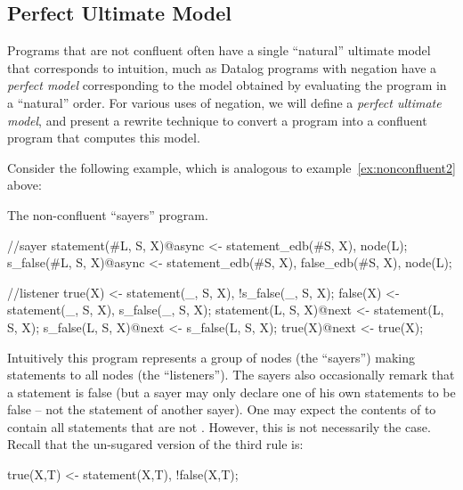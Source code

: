 \subsection{Perfect Ultimate Model}
Programs that are not confluent often have a single ``natural'' ultimate model that corresponds to intuition, much as Datalog programs with negation have a {\em perfect model} corresponding to the model obtained by evaluating the program in a ``natural'' order.  For various uses of negation, we will define a {\em perfect ultimate model}, and present a rewrite technique to convert a \lang program into a confluent program that computes this model.

Consider the following example, which is analogous to example~\ref{ex:nonconfluent2} above:

\begin{example}
\label{ex:sayers}
The non-confluent ``sayers'' program.

\begin{Dedalus}
//sayer
statement(#L, S, X)@async <- statement_edb(#S, X),
                             node(L);
s_false(#L, S, X)@async <- statement_edb(#S, X),
                           false_edb(#S, X),
                           node(L);

//listener
true(X) <- statement(_, S, X), !s_false(_, S, X);
false(X) <- statement(_, S, X), s_false(_, S, X);
statement(L, S, X)@next <- statement(L, S, X);
s_false(L, S, X)@next <- s_false(L, S, X);
true(X)@next <- true(X);
\end{Dedalus}
\end{example}

Intuitively this program represents a group of nodes (the ``sayers'') making statements to all nodes (the ``listeners'').  The sayers also occasionally remark that a statement is false (but a sayer may only declare one of his own statements to be false -- not the statement of another sayer).  One may expect the contents of  to contain all statements that are not .  However, this is not necessarily the case.  Recall that the un-sugared version of the third rule is:

\begin{Dedalus}
true(X,T) <- statement(X,T), !false(X,T);
\end{Dedalus}

